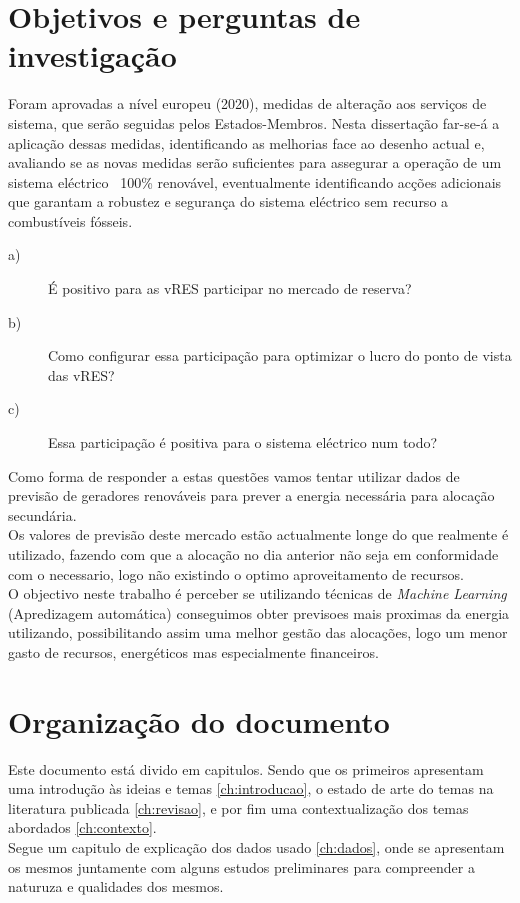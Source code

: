 \section{Objetivos e perguntas de investigação \label{se:objetivos}}

Foram aprovadas a nível europeu (2020), medidas de alteração aos serviços de sistema, que serão seguidas pelos Estados-Membros. Nesta dissertação far-se-á a aplicação dessas medidas, identificando as melhorias face ao desenho actual e, avaliando se as novas medidas serão suficientes para assegurar a operação de um sistema eléctrico ~100\% renovável, eventualmente identificando acções adicionais que garantam a robustez e segurança do sistema eléctrico sem recurso a combustíveis fósseis.

\begin{description}
  \item[a)]\noindent É positivo para as vRES participar no mercado de reserva?
  \item[b)]\noindent Como configurar essa participação para optimizar o lucro do ponto de vista das vRES?
  \item[c)]\noindent Essa participação é positiva para o sistema eléctrico num todo?
\end{description}

Como forma de responder a estas questões vamos tentar utilizar dados de previsão de geradores renováveis para prever a energia necessária para alocação secundária.\\
Os valores de previsão deste mercado estão actualmente longe do que realmente é utilizado, fazendo com que a alocação no dia anterior não seja em conformidade com o necessario, logo não existindo o optimo aproveitamento de recursos. \\
O objectivo neste trabalho é perceber se utilizando técnicas de \textit{Machine Learning} (Apredizagem automática) %
conseguimos obter previsoes mais proximas da energia utilizando, possibilitando assim uma melhor gestão das alocações, logo um menor gasto de recursos, energéticos mas especialmente financeiros.\\

\section{Organização do documento \label{se:organização}}

Este documento está divido em capitulos. Sendo que os primeiros apresentam uma introdução às ideias e temas \ref{ch:introducao}, o estado de arte do temas na literatura publicada \ref{ch:revisao}, e por fim uma contextualização dos temas abordados \ref{ch:contexto}. \\
Segue um capitulo de explicação dos dados usado \ref{ch:dados}, onde se apresentam os mesmos juntamente com alguns estudos preliminares para compreender a naturuza e qualidades dos mesmos. \\%

